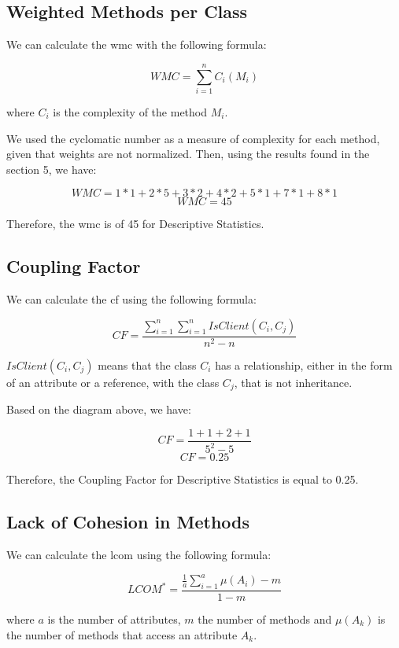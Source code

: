 \documentclass[11pt]{article}
\begin{document}
\subsection{Weighted Methods per Class}

We can calculate the \gls{wmc} with the following formula:

$$ WMC = \sum\limits_{i=1}^{n} C_{i}(M_{i}) $$ 

where $ C_{i} $ is the complexity of the method $ M_{i} $.\newline

We used the cyclomatic number as a measure of complexity for each method, given that weights are not normalized. Then, using the results found in the section 5, we have:

$$ WMC = 1 * 1 + 2 * 5 + 3 * 2 + 4 * 2 + 5 * 1 + 7 * 1 + 8 * 1 $$ 
$$ WMC = 45 $$

Therefore, the \gls{wmc} is of 45 for Descriptive Statistics.

\subsection{Coupling Factor}

We can calculate the \gls{cf} using the following formula:

$$ CF = \frac{\sum\limits_{i=1}^{n} \sum\limits_{i=1}^{n} IsClient(C_{i},C_{j})}{n^2-n} $$

$ IsClient(C_{i},C_{j}) $ means that the class $ C_{i} $ has a relationship, either in the form of an attribute or a reference, with the class $ C_{j} $, that is not inheritance.\newline

Based on the diagram above, we have:

$$ CF = \frac{1+1+2+1}{5^2-5} $$
$$ CF = 0.25 $$

Therefore, the Coupling Factor for Descriptive Statistics is equal to 0.25.

\newpage

\subsection{Lack of Cohesion in Methods}

We can calculate the \gls{lcom} using the following formula:

$$ LCOM^{*} = \frac{\frac{1}{a}\sum\limits_{i=1}^{a} \mu(A_{i})-m}{1-m} $$

where $ a $ is the number of attributes, $ m $ the number of methods and $ \mu(A_{k}) $ is the number of methods that access an attribute $ A_{k} $.
\end{document}
